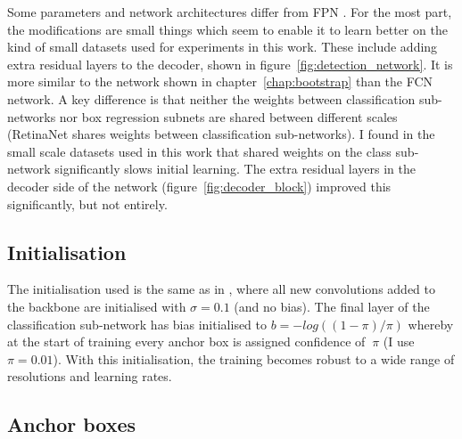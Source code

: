 Some parameters and network architectures differ from \gls{FPN} \cite{Lin2017a}. For the most part, the modifications are small things which seem to enable it to learn better on the kind of small datasets used for experiments in this work. These include adding extra residual layers to the decoder, shown in figure~\ref{fig:detection_network}. It is more similar to the network shown in chapter~\ref{chap:bootstrap} than the \gls{FCN} network. A key difference is that neither the weights between classification sub-networks nor box regression subnets are shared between different scales  (RetinaNet shares weights between classification sub-networks). I found in the small scale datasets used in this work that shared weights on the class sub-network significantly slows initial learning. The extra residual layers in the decoder side of the network (figure~\ref{fig:decoder_block}) improved this significantly, but not entirely. 

\subsection{Initialisation}

The initialisation used is the same as in \cite{Lin2017}, where all new convolutions added to the backbone are initialised with $\sigma=0.1$ (and no bias). The final layer of the classification sub-network has bias initialised to $b = −log((1 − \pi)/\pi) $ whereby at the start of training every anchor box is assigned confidence of $~\pi$ (I use $\pi=0.01$). With this initialisation, the training becomes robust to a wide range of resolutions and learning rates.

\subsection{Anchor boxes}

